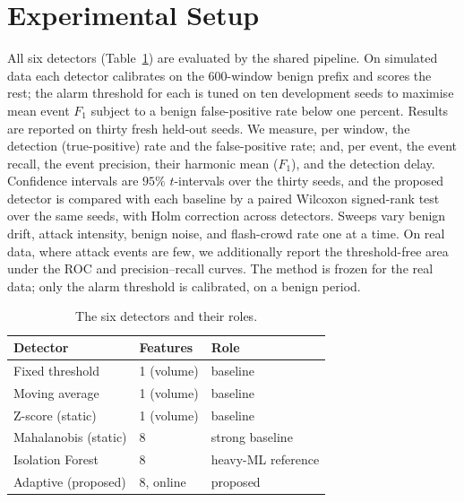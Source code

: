 \documentclass[11pt,a4paper]{article}
\begin{document}
\section{Experimental Setup}
All six detectors (Table~\ref{tab:detectors}) are evaluated by the shared pipeline.
On simulated data each detector calibrates on the $600$-window benign prefix and
scores the rest; the alarm threshold for each is tuned on ten development seeds to
maximise mean event $F_1$ subject to a benign false-positive rate below one
percent. Results are reported on thirty fresh held-out seeds. We measure, per
window, the detection (true-positive) rate and the false-positive rate; and, per
event, the event recall, the event precision, their harmonic mean ($F_1$), and the
detection delay. Confidence intervals are $95\%$ $t$-intervals over the thirty
seeds, and the proposed detector is compared with each baseline by a paired
Wilcoxon signed-rank test over the same seeds, with Holm correction across
detectors. Sweeps vary benign drift, attack intensity, benign noise, and
flash-crowd rate one at a time. On real data, where attack events are few, we
additionally report the threshold-free area under the ROC and precision--recall
curves. The method is frozen for the real data; only the alarm threshold is
calibrated, on a benign period.

\begin{table}[t]
  \centering
  \caption{The six detectors and their roles.}
  \label{tab:detectors}
  \begin{tabular}{lll}
    \toprule
    Detector & Features & Role \\
    \midrule
    Fixed threshold & 1 (volume) & baseline \\
    Moving average & 1 (volume) & baseline \\
    Z-score (static) & 1 (volume) & baseline \\
    Mahalanobis (static) & 8 & strong baseline \\
    Isolation Forest & 8 & heavy-ML reference \\
    Adaptive (proposed) & 8, online & proposed \\
    \bottomrule
  \end{tabular}
\end{table}

\end{document}
